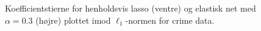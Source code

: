 %
\begin{figure}[H]
\centering
\begin{minipage}{0.4\linewidth}
\end{minipage}
\hspace{0.2cm}
\begin{minipage}{0.4\linewidth}
\end{minipage}
\caption{Koefficientstierne for henholdsvis lasso (ventre) og elastisk net med \(\alpha=0.3\) (højre) plottet imod \(\ell_1\)-normen for crime data.} \label{fig:crime_koef_EN}
\end{figure}
%


\newpage
